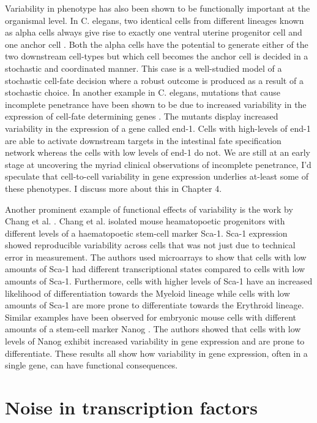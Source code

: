 Variability in phenotype has also been shown to be functionally important at the organismal level. In C. elegans, two identical cells from different lineages known as alpha cells always give rise to exactly one ventral uterine progenitor cell and one anchor cell \cite{seydoux_cell_1989}. Both the alpha cells have the potential to generate either of the two downstream cell-types but which cell becomes the anchor cell is decided in a stochastic and coordinated manner. This case is a well-studied model of a stochastic cell-fate decision where a robust outcome is produced as a result of a stochastic choice. In another example in C. elegans, mutations that cause incomplete penetrance have been shown to be due to increased variability in the expression of cell-fate determining genes  \cite{raj_variability_2010}.  The mutants display increased variability in the expression of a gene called end-1. Cells with high-levels of end-1 are able to activate downstream targets in the intestinal fate specification network whereas the cells with low levels of end-1 do not. We are still at an early stage at uncovering the myriad clinical observations of incomplete penetrance, I'd speculate that cell-to-cell variability in gene expression underlies at-least some of these phenotypes. I discuss more about this in Chapter 4.

Another prominent example of functional effects of variability is the work by Chang et al. \cite{chang_transcriptome-wide_2008}. Chang et al. isolated mouse heamatopoetic progenitors with different levels of a haematopoetic stem-cell marker Sca-1.  Sca-1 expression showed reproducible variability across cells that was not just due to technical error in measurement. The authors used microarrays to show that cells with low amounts of Sca-1 had different transcriptional states compared to cells with low amounts of Sca-1. Furthermore, cells with higher levels of Sca-1 have an increased likelihood of differentiation towards the Myeloid lineage while cells with low amounts of Sca-1 are more prone to differentiate towards the Erythroid lineage. Similar examples have been observed for embryonic mouse cells with different amounts of a stem-cell marker Nanog \cite{kalmar_regulated_2009}. The authors showed that cells with low levels of Nanog exhibit increased variability in gene expression and are prone to differentiate. These results all show how variability in gene expression, often in a single gene, can have functional consequences. 

\section{Noise in transcription factors}

